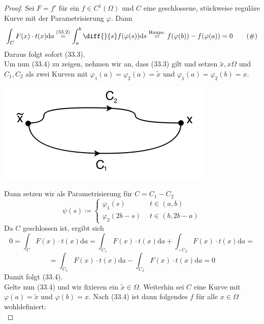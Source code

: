 \begin{proof}
Sei $F=f'$ für ein $f\in C^1(\Omega)$ und $C$ eine 
geschlossene, stückweise reguläre Kurve mit der Parametrisierung 
$\varphi$. Dann 
\begin{equation*}
	\int_C F(x)\cdot t(x)\mathrm{d}a \stackrel{(33.2)}{=} 
	\int_a^b \diff{}{s}f(\varphi(s))\mathrm{d}s 			
	\stackrel{\mathrm{Haups.}}{=} 
	f(\varphi(b)) - f(\varphi(a)) = 0 
	\tag{$\#$}
\end{equation*}
Daraus folgt sofort (33.3).\\ 
Um nun (33.4) zu zeigen, nehmen wir 
an, dass (33.3) gilt und setzen $\tilde{x},x\Omega$ und $C_1, 
C_2$ als zwei Kurven mit $\varphi_1(a) = \varphi_2(a) =
 \tilde{x}$ und $\varphi_1(a) = \varphi_2(b) = x$.
\begin{center}
	\includegraphics[scale=0.5]{pictures/010-03.png}
\end{center}
Dann setzen wir als Parametrisierung für $C=C_1-C_2$
\begin{equation*}
	\psi(s)\coloneqq\left\{\begin{array}{ll}
	\varphi_1(s) &  \ \ t\in(a,b) \\
	\varphi_2(2b-s) & \ \ t\in(b,2b-a)
	\end{array}\right.
\end{equation*}
Da $C$ geschlossen ist, ergibt sich
\begin{equation*}
	0 = \int_C F(x)\cdot t(x)\mathrm{d}a = 
	\int_{C_1} F(x)\cdot t(x)\mathrm{d}a + 
	\int_{-C_2} F(x)\cdot t(x)\mathrm{d}a = 
\end{equation*}
\begin{equation*}
	= \int_{C_1} F(x)\cdot t(x)\mathrm{d}a - 
	\int_{C_2} F(x)\cdot t(x)\mathrm{d}a = 0
\end{equation*}
Damit folgt (33.4).\\
Gelte nun (33.4) und wir fixieren ein $\tilde{x}\in\Omega$. 
Weiterhin sei $C$ eine Kurve mit $\varphi(a)=\tilde{x}$ und 
$\varphi(b)=x$. Nach (33.4) ist dann folgendes $f$ für alle 
$x\in\Omega$ wohldefiniert:
\begin{equation*}

\end{equation*}
\end{proof}
